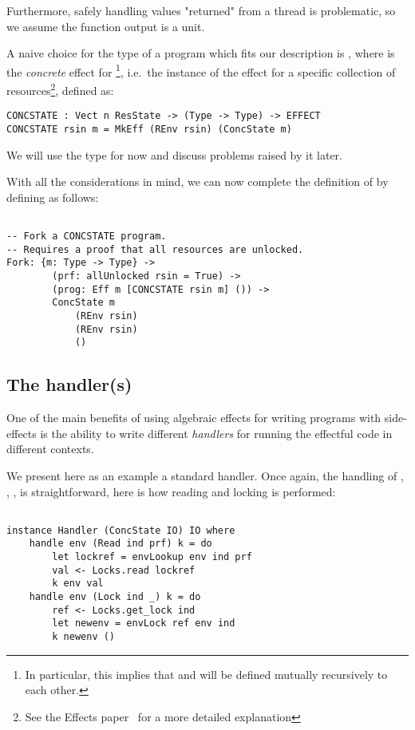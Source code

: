 Furthermore, safely handling values "returned" from a thread is problematic, so
we assume the function output is a unit.

A naive choice for the type of a program which fits our description is
, where  is the
\emph{concrete} effect for {\footnote{In
particular, this implies that  and  will be
defined mutually recursively to each other.}}, i.e.~the
instance of the effect for a specific collection of resources\footnote{See the
Effects paper~\cite[p.~2]{effects-idr} for a more detailed explanation},
defined as:

\begin{BVerbatim}
CONCSTATE : Vect n ResState -> (Type -> Type) -> EFFECT
CONCSTATE rsin m = MkEff (REnv rsin) (ConcState m)
\end{BVerbatim}

We will use the type  for now and discuss
problems raised by it later.

With all the considerations in mind, we can now complete the definition of
 by defining  as follows:

\begin{BVerbatim}

-- Fork a CONCSTATE program.
-- Requires a proof that all resources are unlocked.
Fork: {m: Type -> Type} ->
        (prf: allUnlocked rsin = True) ->
        (prog: Eff m [CONCSTATE rsin m] ()) ->
        ConcState m
            (REnv rsin)
            (REnv rsin)
            ()

\end{BVerbatim}

\subsection{The handler(s)}

One of the main benefits of using algebraic effects for writing programs with
side-effects is the ability to write different \emph{handlers} for running the
effectful code in different contexts.

We present here as an example a standard  handler. Once again, the
handling of , , ,  is
straightforward, here is how reading and locking is performed:

\begin{BVerbatim}

instance Handler (ConcState IO) IO where
    handle env (Read ind prf) k = do
        let lockref = envLookup env ind prf
        val <- Locks.read lockref
        k env val
    handle env (Lock ind _) k = do
        ref <- Locks.get_lock ind
        let newenv = envLock ref env ind
        k newenv ()

\end{BVerbatim}

